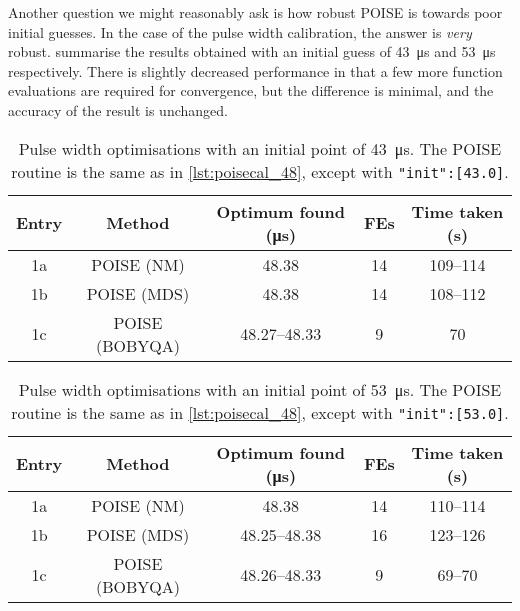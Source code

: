 Another question we might reasonably ask is how robust POISE is towards poor initial guesses.
In the case of the pulse width calibration, the answer is \textit{very} robust.
 summarise the results obtained with an initial guess of \SI{43}{\us} and \SI{53}{\us} respectively.
There is slightly decreased performance in that a few more function evaluations are required for convergence, but the difference is minimal, and the accuracy of the result is unchanged.

\begin{table}
    \centering
    \begin{tabular}{ccccc}
        \toprule
        Entry & Method      & Optimum found (\si{\us}) & FEs & Time taken (\si{\s}) \\
        \midrule
        1a & POISE (NM)     & 48.38        & 14 & 109--114 \\
        1b & POISE (MDS)    & 48.38        & 14 & 108--112  \\
        1c & POISE (BOBYQA) & 48.27--48.33 & 9  & 70       \\
        \bottomrule
    \end{tabular}
    \caption[POISE pulse width calibration using initial guess of \SI{43}{\us}]{
        Pulse width optimisations with an initial point of \SI{43}{\us}.
        The POISE routine is the same as in \cref{lst:poisecal_48}, except with \texttt{"init":[43.0]}.
    }
    \label{tbl:poisecal_43}
\end{table}

\begin{table}
    \centering
    \begin{tabular}{ccccc}
        \toprule
        Entry & Method      & Optimum found (\si{\us}) & FEs & Time taken (\si{\s}) \\
        \midrule
        1a & POISE (NM)     & 48.38        & 14 & 110--114 \\
        1b & POISE (MDS)    & 48.25--48.38 & 16 & 123--126 \\
        1c & POISE (BOBYQA) & 48.26--48.33 & 9  & 69--70   \\
        \bottomrule
    \end{tabular}
    \caption[POISE pulse width calibration using initial guess of \SI{53}{\us}]{
        Pulse width optimisations with an initial point of \SI{53}{\us}.
        The POISE routine is the same as in \cref{lst:poisecal_48}, except with \texttt{"init":[53.0]}.
    }
    \label{tbl:poisecal_53}
\end{table}


